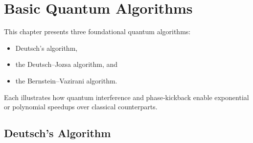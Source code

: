 \chapter{Basic Quantum Algorithms}

This chapter presents three foundational quantum algorithms: \begin{itemize}
	\item Deutsch's algorithm, 
	\item the Deutsch--Jozsa algorithm, and 
	\item the Bernstein--Vazirani algorithm.
\end{itemize} Each illustrates how quantum interference and phase‐kickback enable exponential or polynomial speedups over classical counterparts.

\section{Deutsch's Algorithm}\label{sec:Deutsch}
